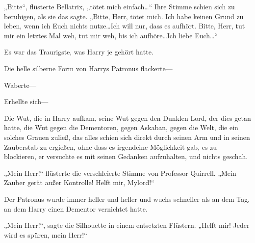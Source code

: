 „Bitte“, flüsterte Bellatrix, „tötet mich einfach…“ Ihre Stimme schien sich zu beruhigen, als sie das sagte. „Bitte, Herr, tötet mich. Ich habe keinen Grund zu leben, wenn ich Euch nichts nutze…Ich will nur, dass es aufhört. Bitte, Herr, tut mir ein letztes Mal weh, tut mir weh, bis ich aufhöre…Ich liebe Euch…“

Es war das Traurigste, was Harry je gehört hatte.

Die helle silberne Form von Harrys Patronus flackerte—

Waberte—

Erhellte sich—

Die Wut, die in Harry aufkam, seine Wut gegen den Dunklen Lord, der dies getan hatte, die Wut gegen die Dementoren, gegen Askaban, gegen die Welt, die ein solches Grauen zuließ, das alles schien sich direkt durch seinen Arm und in seinen Zauberstab zu ergießen, ohne dass es irgendeine Möglichkeit gab, es zu blockieren, er versuchte es mit seinen Gedanken aufzuhalten, und nichts geschah.

„Mein Herr!“ flüsterte die verschleierte Stimme von Professor Quirrell. „Mein Zauber gerät außer Kontrolle! Helft mir, Mylord!“

Der Patronus wurde immer heller und heller und wuchs schneller als an dem Tag, an dem Harry einen Dementor vernichtet hatte.

„Mein Herr!“, sagte die Silhouette in einem entsetzten Flüstern. „Helft mir! Jeder wird es spüren, mein Herr!“

